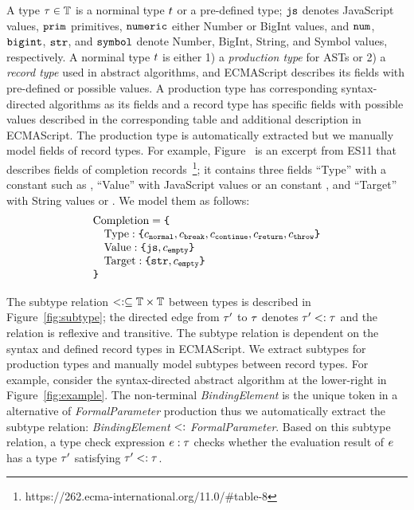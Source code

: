 A type $\tau \in \mathbb{T}$ is a norminal type $t$ or a pre-defined type;
$\texttt{js}$ denotes JavaScript values, $\texttt{prim}$ primitives, $\texttt{numeric}$ either Number
or BigInt values, and $\texttt{num}$, $\texttt{bigint}$, $\texttt{str}$, and $\texttt{symbol}$ denote Number,
BigInt, String, and Symbol values, respectively.  A norminal type $t$ is
either 1) a \textit{production type} for ASTs or 2) a \textit{record type} used
in abstract algorithms, and ECMAScript describes its fields with pre-defined or
possible values.  A production type has corresponding syntax-directed algorithms
as its fields and a record type has specific fields with possible values
described in the corresponding table and additional description in ECMAScript.
The production type is automatically extracted but we manually model fields of
record types.  For example, Figure~\label{fig:record-fields-table} is an excerpt
from ES11 that describes fields of completion
records~\footnote{https://262.ecma-international.org/11.0/\#table-8}; it
contains three fields ``Type'' with a constant such as , ``Value''
with JavaScript values or an constant , and ``Target'' with String
values or .  We model them as follows:
\small
\[
  \begin{array}{l}
    \text{Completion} = \texttt{\{}\\
    \quad \text{Type}: \texttt{\{} c_{\texttt{normal}}, c_{\texttt{break}}, c_{\texttt{continue}},
    c_{\texttt{return}}, c_{\texttt{throw}} \texttt{\}}\\
    \quad \text{Value}: \texttt{\{} \texttt{js}, c_{\texttt{empty}} \texttt{\}}\\
    \quad \text{Target}: \texttt{\{} \texttt{str}, c_{\texttt{empty}} \texttt{\}}\\
    \texttt{\}}\\
  \end{array}
\]

The subtype relation $<: \subseteq \mathbb{T} \times \mathbb{T}$ between types is
described in Figure~\ref{fig:subtype}; the directed edge from $\tau'$ to $\tau$
denotes $\tau' <: \tau$ and the relation is reflexive and transitive.  The
subtype relation is dependent on the syntax and defined record types in
ECMAScript.  We extract subtypes for production types and manually model
subtypes between record types.  For example, consider the syntax-directed
abstract algorithm at the lower-right in Figure~\ref{fig:example}.  The
non-terminal \textit{BindingElement} is the unique token in a alternative of
\textit{FormalParameter} production thus we automatically extract the subtype
relation: \textit{BindingElement} $<:$ \textit{FormalParameter}.  Based on
this subtype relation, a type check expression $e: \tau$ checks whether the
evaluation result of $e$ has a type $\tau'$ satisfying $\tau' <: \tau$.

